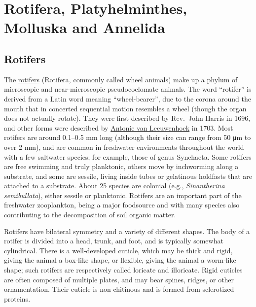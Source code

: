\chapter{Rotifera, Platyhelminthes, Molluska and
Annelida}\label{rotifera-platyhelminthes-molluska-and-annelida}

\section{Rotifers}\label{rotifers}

The \href{https://en.wikipedia.org/wiki/Rotifer}{rotifers} (Rotifera,
commonly called wheel animals) make up a phylum of microscopic and
near-microscopic pseudocoelomate animals. The word ``rotifer'' is
derived from a Latin word meaning ``wheel-bearer'', due to the corona
around the mouth that in concerted sequential motion resembles a wheel
(though the organ does not actually rotate). They were first described
by Rev.~John Harris in 1696, and other forms were described by \href{https://en.wikipedia.org/wiki/Antonie_van_Leeuwenhoek}{Antonie
van Leeuwenhoek} in 1703. Most rotifers are around 0.1--0.5 mm long
(although their size can range from 50 μm to over 2 mm), and are common
in freshwater environments throughout the world with a few saltwater
species; for example, those of genus Synchaeta. Some rotifers are free
swimming and truly planktonic, others move by inchworming along a
substrate, and some are sessile, living inside tubes or gelatinous
holdfasts that are attached to a substrate. About 25 species are
colonial (e.g., \emph{Sinantherina semibullata}), either sessile or planktonic.
Rotifers are an important part of the freshwater zooplankton, being a
major foodsource and with many species also contributing to the
decomposition of soil organic matter.

Rotifers have bilateral symmetry and a variety of different shapes. The
body of a rotifer is divided into a head, trunk, and foot, and is
typically somewhat cylindrical. There is a well-developed cuticle, which
may be thick and rigid, giving the animal a box-like shape, or flexible,
giving the animal a worm-like shape; such rotifers are respectively
called loricate and illoricate. Rigid cuticles are often composed of
multiple plates, and may bear spines, ridges, or other ornamentation.
Their cuticle is non-chitinous and is formed from sclerotized proteins.

